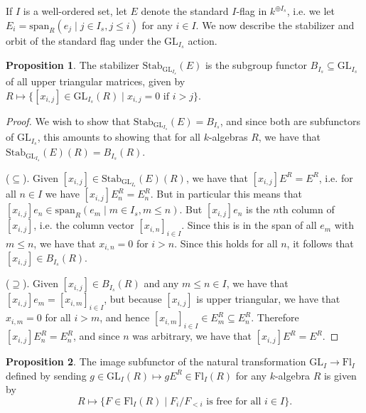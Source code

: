 \documentclass[oneside,11pt]{amsart}
\newcommand{\GL}{\ensuremath{\text{GL}}}
\newcommand{\Fl}{\ensuremath{\text{Fl}}}
\newcommand{\Stab}{\ensuremath{\text{Stab}}}
\newcommand{\Span}{\ensuremath{\text{span}}}
\theoremstyle{definition}
\newtheorem{proof techniques}{Proof Techniques}
\newtheorem{proposition}{Proposition}
\begin{document}
If $I$ is a well-ordered set, let $E$ denote the standard $I$-flag in $k^{\oplus I_s}$, i.e. we let $E_i = \Span_R(e_j \mid j \in I_s, j \leq i)$ for any $i \in I$. We now describe the stabilizer and orbit of the standard flag under the $\GL_{I_s}$ action. 




\begin{proposition}\label{prop: stab of standard flag is upper triangulars}
The stabilizer $\Stab_{\GL_{I_s}}(E)$ is the subgroup functor $B_{I_s} \subseteq \GL_{I_s}$ of all upper triangular matrices, given by $R \mapsto \{ [x_{i , j} ] \in \GL_{I_s}(R) \mid x_{i , j} = 0 \text{ if } i > j\}$. 
\end{proposition}

\begin{proof}
We wish to show that $\Stab_{\GL_{I_s}}(E) = B_{I_s}$, and since both are subfunctors of $\GL_{I_s}$, this amounts to showing that for all $k$-algebras $R$, we have that $\Stab_{\GL_{I_s}}(E)(R) = B_{I_s}(R)$. 

($\subseteq$). Given $[x_{i , j}] \in \Stab_{\GL_{I_s}}(E)(R)$, we have that $[x_{i , j}] E^R = E^R$, i.e. for all $n \in I$ we have $[x_{i , j}] E^R_n = E^R_n$. But in particular this means that $[x_{i , j} ] e_n \in \Span_R(e_m \mid m \in I_s, m \leq n)$. But $[x_{i , j} ] e_n$ is the $n$th column of $[x_{i , j}]$, i.e. the column vector $[x_{i , n}]_{i \in I}$. Since this is in the span of all $e_m$ with $m \leq n$, we have that $x_{i , n} = 0$ for $i > n$. Since this holds for all $n$, it follows that $[x_{i , j}] \in B_{I_s}(R)$. 

($\supseteq$). Given $[x_{i , j}] \in B_{I_s}(R)$ and any $m \leq n \in I$, we have that $[x_{i , j}] e_m = [x_{i , m}]_{i \in I}$, but because $[x_{i , j}]$ is upper triangular, we have that $x_{i , m} = 0$ for all $i > m$, and hence $[x_{i , m}]_{i \in I} \in E^R_m \subseteq E^R_n$. Therefore $[x_{i , j}] E^R_n = E^R_n$, and since $n$ was arbitrary, we have that $[x_{i , j}] E^R = E^R$. 

\end{proof}



\begin{proposition}\label{prop: naive orbit of the standard flag}
The image subfunctor of the natural transformation $\GL_I \to \Fl_I$ defined by sending $g \in \GL_I(R) \mapsto gE^R \in \Fl_I(R)$ for any $k$-algebra $R$ is given by 
\begin{equation*}
R \mapsto \{ F \in \Fl_I(R) \mid F_i / F_{<i} \text{ is free for all } i \in I \}. 
\end{equation*}
\end{proposition}
\end{document}
